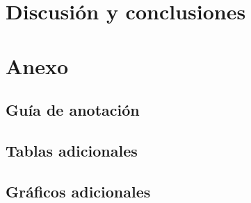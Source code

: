 \documentclass[colorinlistoftodos]{article}
\begin{document}
\section{Discusi\'on y conclusiones}\label{section-discussion}


\newpage



\clearpage
\appendix
\section{Anexo}\label{appendix}

\subsection{Gu\'ia de anotaci\'on}\label{appendix-annotation}


\subsection{Tablas adicionales}\label{appendix-tables}


\subsection{Gr\'aficos adicionales}\label{appendix-plots}


\end{document}
